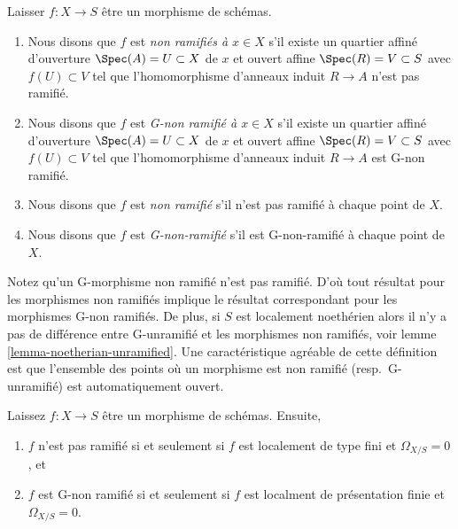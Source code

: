 \begin{definition}

\label{definition-unramified}

Laisser $f : X \to S$ être un morphisme de schémas.

\begin{enumerate}

\item Nous disons que $f$ est {\it non ramifiés à $x \in X$} s'il existe un quartier affiné d'ouverture $\Spec(A) = U \subset X$
de $x$ et ouvert affine $\Spec(R) = V \subset S$
avec $f(U) \subset V$ tel que l'homomorphisme d'anneaux induit
$R \to A$ n'est pas ramifié.
\item Nous disons que $f$ est {\it G-non ramifié à $x \in X$} s'il existe un quartier affiné d'ouverture $\Spec(A) = U \subset X$
de $x$ et ouvert affine $\Spec(R) = V \subset S$
avec $f(U) \subset V$ tel que l'homomorphisme d'anneaux induit
$R \to A$ est G-non ramifié.
\item Nous disons que $f$ est {\it non ramifié} s'il n'est pas ramifié à chaque point de $X$.
\item Nous disons que $f$ est {\it G-non-ramifié} s'il est G-non-ramifié à chaque point de $X$.

\end{enumerate}

\end{definition}

\noindent
Notez qu'un G-morphisme non ramifié n'est pas ramifié. D'où tout résultat pour les morphismes non ramifiés implique le résultat correspondant pour les morphismes G-non ramifiés. De plus, si $S$ est localement noethérien alors il n'y a pas de différence entre G-unramifié et les morphismes non ramifiés, voir lemme \ref{lemma-noetherian-unramified}. Une caractéristique agréable de cette définition est que l'ensemble des points où un morphisme est non ramifié (resp.\ G-unramifié) est automatiquement ouvert.

\begin{lemma}

\label{lemma-unramified-omega-zero}
Laissez $f : X \to S$ être un morphisme de schémas. Ensuite,
\begin{enumerate}
\item $f$ n'est pas ramifié si et seulement si $f$ est localement de type fini et $\Omega_{X/S} = 0$, et
\item $f$ est G-non ramifié si et seulement si $f$ est localment de présentation finie et $\Omega_{X/S} = 0$.
\end{enumerate}

\end{lemma}

